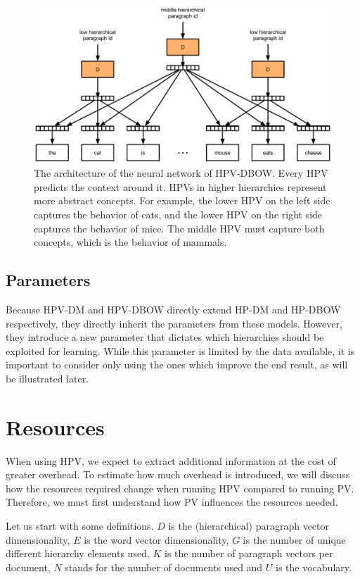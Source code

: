 \begin{figure}
	\centering
	\includegraphics[width=1.0\textwidth]{4hpvs/hpv-dbow.png}
	\caption{The architecture of the neural network of HPV-DBOW\@. Every HPV predicts the context around it. HPVs in higher hierarchies represent more abstract concepts. For example, the lower HPV on the left side captures the behavior of cats, and the lower HPV on the right side captures the behavior of mice. The middle HPV must capture both concepts, which is the behavior of mammals.}
	\label{fig:4:hpv-dbow}
\end{figure}

\subsection{Parameters}\label{parameters}

Because HPV-DM and HPV-DBOW directly extend HP-DM and HP-DBOW respectively, they directly inherit the parameters from these models. However, they introduce a new parameter that dictates which hierarchies should be exploited for learning. While this parameter is limited by the data available, it is important to consider only using the ones which improve the end result, as will be illustrated later.

\section{Resources}\label{4:resources}

When using HPV, we expect to extract additional information at the cost of greater overhead. To estimate how much overhead is introduced, we will discuss how the resources required change when running HPV compared to running PV\@. Therefore, we must first understand how PV influences the resources needed.

Let us start with some definitions. $D$ is the (hierarchical) paragraph vector dimensionality, $E$ is the word vector dimensionality, $G$ is the number of unique different hierarchy elements used, $K$ is the number of paragraph vectors per document, $N$ stands for the number of documents used and $U$ is the vocabulary.

